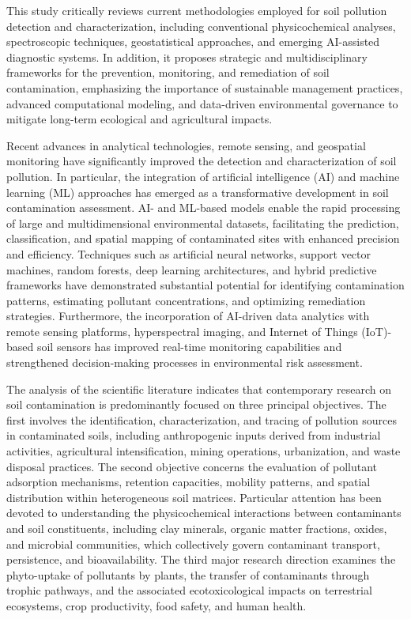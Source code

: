 \documentclass[sn-mathphys-num]{sn-jnl}
\begin{document}
This study critically reviews current methodologies employed for soil pollution
detection and characterization, including conventional physicochemical
analyses, spectroscopic techniques, geostatistical approaches, and emerging
AI-assisted diagnostic systems. In addition, it proposes strategic and
multidisciplinary frameworks for the prevention, monitoring, and remediation
of soil contamination, emphasizing the importance of sustainable management
practices, advanced computational modeling, and data-driven environmental
governance to mitigate long-term ecological and agricultural impacts.

Recent advances in analytical technologies, remote sensing, and geospatial
monitoring have significantly improved the detection and characterization of
soil pollution. In particular, the integration of artificial intelligence (AI)
and machine learning (ML) approaches has emerged as a transformative
development in soil contamination assessment. AI- and ML-based models enable
the rapid processing of large and multidimensional environmental datasets,
facilitating the prediction, classification, and spatial mapping of
contaminated sites with enhanced precision and efficiency. Techniques such as
artificial neural networks, support vector machines, random forests, deep
learning architectures, and hybrid predictive frameworks have demonstrated
substantial potential for identifying contamination patterns, estimating
pollutant concentrations, and optimizing remediation strategies. Furthermore,
the incorporation of AI-driven data analytics with remote sensing platforms,
hyperspectral imaging, and Internet of Things (IoT)-based soil sensors has
improved real-time monitoring capabilities and strengthened decision-making
processes in environmental risk assessment.

The analysis of the scientific literature indicates that contemporary research
on soil contamination is predominantly focused on three principal objectives.
The first involves the identification, characterization, and tracing of
pollution sources in contaminated soils, including anthropogenic inputs derived
from industrial activities, agricultural intensification, mining operations,
urbanization, and waste disposal practices. The second objective concerns the
evaluation of pollutant adsorption mechanisms, retention capacities, mobility
patterns, and spatial distribution within heterogeneous soil matrices.
Particular attention has been devoted to understanding the physicochemical
interactions between contaminants and soil constituents, including clay
minerals, organic matter fractions, oxides, and microbial communities, which
collectively govern contaminant transport, persistence, and bioavailability.
The third major research direction examines the phyto-uptake of pollutants by
plants, the transfer of contaminants through trophic pathways, and the
associated ecotoxicological impacts on terrestrial ecosystems, crop
productivity, food safety, and human health.
\end{document}
